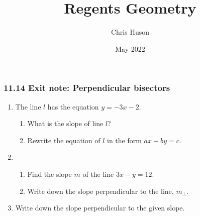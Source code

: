 \documentclass[12pt, twoside]{article}
\title{Regents Geometry}
\author{Chris Huson}
\date{May 2022}
\begin{document}
\subsubsection*{11.14 Exit note: Perpendicular bisectors}
\begin{enumerate}
\item The line $l$ has the equation $y=-3x-2$.
  \begin{enumerate}
    \item What is the slope of line $l$?
    \vspace{0.5cm}
    \item Rewrite the equation of $l$ in the form $ax+by=c$.
    \vspace{1.3cm}
  \end{enumerate}

\item   
 \begin{enumerate}
  \item Find the slope $m$ of the line $3x-y=12$.
  \vspace{2cm}
  \item Write down the slope perpendicular to the line, $m_{\perp}$.
  \vspace{0.5cm}
\end{enumerate}

\item Write down the slope perpendicular to the given slope.
\begin{enumerate}
\end{enumerate} \vspace{0.5cm}


\end{enumerate}
\end{document}
